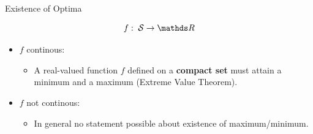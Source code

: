 \documentclass[11pt,compress,t,notes=noshow, xcolor=table]{beamer}
\begin{document}
  
  \begin{vbframe}{Existence of Optima}
  
  $$
  f: \; \mathcal{S} \to \R
  $$
  
  \begin{itemize}
  \item $f$ continous:
  \begin{itemize}
  \item A real-valued function $f$ defined on a \textbf{compact set} must attain a minimum and a maximum (Extreme Value Theorem).
  \end{itemize}
  \item $f$ not continous:
  \begin{itemize}
  \item In general no statement possible about existence of maximum/minimum.
  \end{itemize}
  \end{itemize}
  
  
  \end{vbframe}
    
\end{document}
